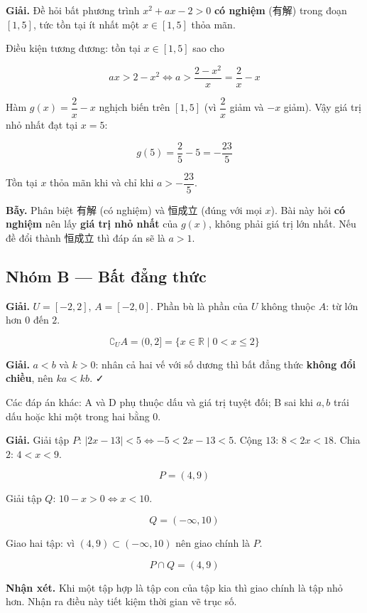 \documentclass[11pt, a4paper]{article}
\begin{document}
\begin{dapan}[25 — Đáp án A]
\textbf{Giải.} Đề hỏi bất phương trình $x^2 + ax - 2 > 0$ \textbf{có nghiệm} (有解) trong đoạn $[1, 5]$, tức tồn tại ít nhất một $x \in [1,5]$ thỏa mãn.

Điều kiện tương đương: tồn tại $x \in [1,5]$ sao cho

$$ax > 2 - x^2 \iff a > \frac{2 - x^2}{x} = \frac{2}{x} - x$$

Hàm $g(x) = \dfrac{2}{x} - x$ nghịch biến trên $[1,5]$ (vì $\dfrac{2}{x}$ giảm và $-x$ giảm). Vậy giá trị nhỏ nhất đạt tại $x = 5$:

$$g(5) = \frac{2}{5} - 5 = -\frac{23}{5}$$

Tồn tại $x$ thỏa mãn khi và chỉ khi $a > -\dfrac{23}{5}$.

\textbf{Bẫy.} Phân biệt 有解 (có nghiệm) và 恒成立 (đúng với mọi $x$). Bài này hỏi \textbf{có nghiệm} nên lấy \textbf{giá trị nhỏ nhất} của $g(x)$, không phải giá trị lớn nhất. Nếu đề đổi thành 恒成立 thì đáp án sẽ là $a > 1$.
\end{dapan}

\subsection*{Nhóm B — Bất đẳng thức}

\begin{dapan}[1 — Đáp án C]
\textbf{Giải.} $U = [-2, 2]$, $A = [-2, 0]$. Phần bù là phần của $U$ không thuộc $A$: từ lớn hơn $0$ đến $2$.

$$\complement_U A = (0, 2] = \{x \in \mathbb{R} \mid 0 < x \le 2\}$$
\end{dapan}

\begin{dapan}[2 — Đáp án C]
\textbf{Giải.} $a < b$ và $k > 0$: nhân cả hai vế với số dương thì bất đẳng thức \textbf{không đổi chiều}, nên $ka < kb$. ✓

Các đáp án khác: A và D phụ thuộc dấu và giá trị tuyệt đối; B sai khi $a, b$ trái dấu hoặc khi một trong hai bằng $0$.
\end{dapan}

\begin{dapan}[3 — Đáp án A]
\textbf{Giải.} Giải tập $P$: $|2x - 13| < 5 \iff -5 < 2x - 13 < 5$. Cộng $13$: $8 < 2x < 18$. Chia $2$: $4 < x < 9$.

$$P = (4, 9)$$

Giải tập $Q$: $10 - x > 0 \iff x < 10$.

$$Q = (-\infty, 10)$$

Giao hai tập: vì $(4,9) \subset (-\infty, 10)$ nên giao chính là $P$.

$$P \cap Q = (4, 9)$$

\textbf{Nhận xét.} Khi một tập hợp là tập con của tập kia thì giao chính là tập nhỏ hơn. Nhận ra điều này tiết kiệm thời gian vẽ trục số.
\end{dapan}
\end{document}
